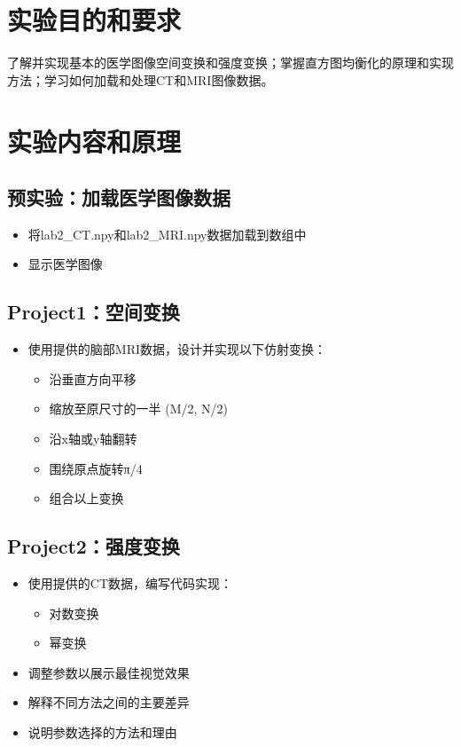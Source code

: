 \documentclass[10.5pt]{config}
\date{2025年3月13日}
\begin{document}
\makeheader %


\section{实验目的和要求}
了解并实现基本的医学图像空间变换和强度变换；掌握直方图均衡化的原理和实现方法；学习如何加载和处理CT和MRI图像数据。

\section{实验内容和原理}
\subsection{预实验：加载医学图像数据}
\begin{itemize}
    \item 将lab2\_CT.npy和lab2\_MRI.npy数据加载到数组中
    \item 显示医学图像
\end{itemize}

\subsection{Project1：空间变换}
\begin{itemize}
    \item 使用提供的脑部MRI数据，设计并实现以下仿射变换：
    \begin{itemize}
        \item 沿垂直方向平移
        \item 缩放至原尺寸的一半 (M/2, N/2)
        \item 沿x轴或y轴翻转
        \item 围绕原点旋转π/4
        \item 组合以上变换
    \end{itemize}
\end{itemize}

\subsection{Project2：强度变换}
\begin{itemize}
    \item 使用提供的CT数据，编写代码实现：
    \begin{itemize}
        \item 对数变换
        \item 幂变换
    \end{itemize}
    \item 调整参数以展示最佳视觉效果
    \item 解释不同方法之间的主要差异
    \item 说明参数选择的方法和理由
\end{itemize}
\end{document}
